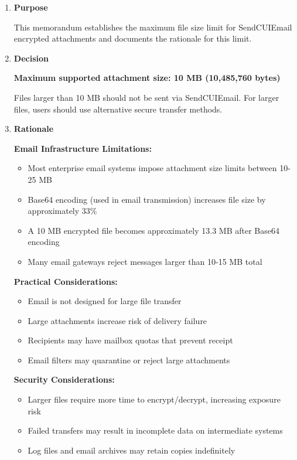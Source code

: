 \documentclass[11pt,letterpaper]{article}
\newcommand{\dmsection}[1]{\item \textbf{#1}\par}
\begin{document}
\begin{enumerate}

\dmsection{Purpose}

This memorandum establishes the maximum file size limit for SendCUIEmail encrypted attachments and documents the rationale for this limit.

\dmsection{Decision}

\textbf{Maximum supported attachment size: 10 MB (10,485,760 bytes)}

Files larger than 10 MB should not be sent via SendCUIEmail. For larger files, users should use alternative secure transfer methods.

\dmsection{Rationale}

\textbf{Email Infrastructure Limitations:}
\begin{itemize}
    \item Most enterprise email systems impose attachment size limits between 10-25 MB
    \item Base64 encoding (used in email transmission) increases file size by approximately 33\%
    \item A 10 MB encrypted file becomes approximately 13.3 MB after Base64 encoding
    \item Many email gateways reject messages larger than 10-15 MB total
\end{itemize}

\textbf{Practical Considerations:}
\begin{itemize}
    \item Email is not designed for large file transfer
    \item Large attachments increase risk of delivery failure
    \item Recipients may have mailbox quotas that prevent receipt
    \item Email filters may quarantine or reject large attachments
\end{itemize}

\textbf{Security Considerations:}
\begin{itemize}
    \item Larger files require more time to encrypt/decrypt, increasing exposure risk
    \item Failed transfers may result in incomplete data on intermediate systems
    \item Log files and email archives may retain copies indefinitely
\end{itemize}


\end{enumerate}
\end{document}

